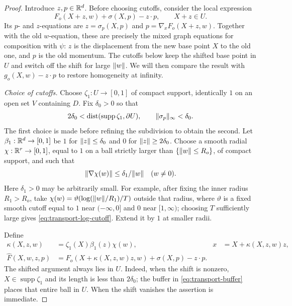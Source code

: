 \begin{proof}
Introduce $z,p\in\mathbb R^d$. Before choosing cutoffs, consider the local expression
\[
 F_o(X+z,w)+\sigma(X,p)-z\cdot p,
 \qquad X+z\in U.
\]
Its $p$- and $z$-equations are $z=\sigma_p(X,p)$ and
$p=\nabla_xF_o(X+z,w)$. Together with the old $w$-equation,
these are precisely the mixed graph equations for composition with
$\psi$: $z$ is the displacement from the new base point $X$ to the
old one, and $p$ is the old momentum. The cutoffs below keep the
shifted base point in $U$ and switch off the shift for large
$\lVert w\rVert$. We will then compare the result with
$g_o(X,w)-z\cdot p$ to restore homogeneity at infinity.

\emph{Choice of cutoffs.}
Choose $\zeta_1:U\to[0,1]$ of compact support, identically $1$ on
an open set $V$ containing $D$.  Fix $\delta_0>0$ so that
\begin{equation}
 2\delta_0<\operatorname{dist}(\operatorname{supp}\zeta_1,\partial U),
 \qquad \lVert\sigma_p\rVert_\infty<\delta_0.
 \label{eq:transport-buffer}
\end{equation}
The first choice is made before refining the subdivision to obtain
the second.  Let $\beta_1:\mathbb R^d\to[0,1]$ be $1$ for
$\lVert z\rVert\le\delta_0$ and $0$ for $\lVert z\rVert\ge2\delta_0$.
Choose a smooth radial $\chi:\mathbb R^r\to[0,1]$, equal to $1$ on a ball
strictly larger than $\{\lVert w\rVert\le R_o\}$, of compact support, and such
that
\begin{equation}
 \lVert\nabla\chi(w)\rVert\le\delta_1/\lVert w\rVert\quad(w\ne0).
 \label{eq:transport-log-cutoff}
\end{equation}
Here $\delta_1>0$ may be arbitrarily small.  For example, after fixing
the inner radius $R_1>R_o$, take
$\chi(w)=\vartheta(\log(\lVert w\rVert/R_1)/T)$ outside that radius, where
$\vartheta$ is a fixed smooth cutoff equal to $1$ near $(-\infty,0]$
and $0$ near $[1,\infty)$; choosing $T$ sufficiently large gives
\eqref{eq:transport-log-cutoff}.  Extend it by $1$ at smaller radii.

Define
\begin{align}
 \kappa(X,z,w)&=\zeta_1(X)\beta_1(z)\chi(w),
 &x&=X+\kappa(X,z,w)z,\label{eq:transport-kappa}\\
 \widehat F(X,w,z,p)
   &=F_o(X+\kappa(X,z,w)z,w)+\sigma(X,p)-z\cdot p.
 \label{eq:transport-shifted-family}
\end{align}
The shifted argument always lies in $U$.  Indeed, when the shift is
nonzero, $X\in\operatorname{supp}\zeta_1$ and its length is less
than $2\delta_0$; the buffer in \eqref{eq:transport-buffer} places
that entire ball in $U$.  When the shift vanishes the assertion is
immediate.


\end{proof}
